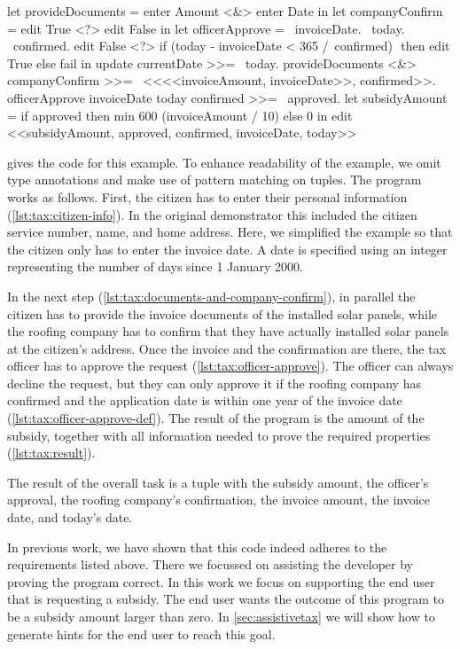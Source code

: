 \begin{TASK}[
    float=ht,
    numbers=right,
    caption={Subsidy request and approval workflow at the Dutch tax office.},
    label=lst:tax]
  let provideDocuments = enter Amount <&> enter Date in
  let companyConfirm = edit True <?> edit False in
  let officerApprove = \ invoiceDate. \ today. \ confirmed.
    edit False <?> if (today - invoiceDate < 365 /\ confirmed) $\label{lst:tax:officer-approve-def}$ then edit True else fail in
  update currentDate >>= \ today.$\label{lst:tax:citizen-info}$
  provideDocuments <&> companyConfirm >>= \ <<<<invoiceAmount, invoiceDate>>, confirmed>>. $\label{lst:tax:documents-and-company-confirm}$
  officerApprove invoiceDate today confirmed >>= \ approved.$\label{lst:tax:officer-approve}$
  let subsidyAmount = if approved then min 600 (invoiceAmount / 10) else 0 in
  edit <<subsidyAmount, approved, confirmed, invoiceDate, today>>$\label{lst:tax:result}$
\end{TASK}

 gives the \TOPHAT code for this example.
To enhance readability of the example,
we omit type annotations and make use of pattern matching on tuples.
The program works as follows.
First, the citizen has to enter their personal information (\cref{lst:tax:citizen-info}).
In the original demonstrator this included the citizen service number, name, and home address.
Here, we simplified the example so that the citizen only has to enter the invoice date.
A date is specified using an integer representing the number of days since 1 January 2000.

In the next step (\cref{lst:tax:documents-and-company-confirm}), in parallel the citizen has to provide the invoice documents of the installed solar panels, while the roofing company has to confirm that they have actually installed solar panels at the citizen's address.
Once the invoice and the confirmation are there, the tax officer has to approve the request (\cref{lst:tax:officer-approve}).
The officer can always decline the request, but they can only approve it if the roofing company has confirmed and the application date is within one year of the invoice date (\cref{lst:tax:officer-approve-def}).
The result of the program is the amount of the subsidy, together with all information needed to prove the required properties (\cref{lst:tax:result}).

The result of the overall task is a tuple with the subsidy amount, the officer's approval, the roofing company's confirmation, the invoice amount, the invoice date, and today's date.

In previous work, we have shown that this code indeed adheres to the requirements listed above.
There we focussed on assisting the developer by proving the program correct.
In this work we focus on supporting the end user that is requesting a subsidy.
The end user wants the outcome of this program to be a subsidy amount larger than zero.
In \cref{sec:assistivetax} we will show how to generate hints for the end user to reach this goal.
